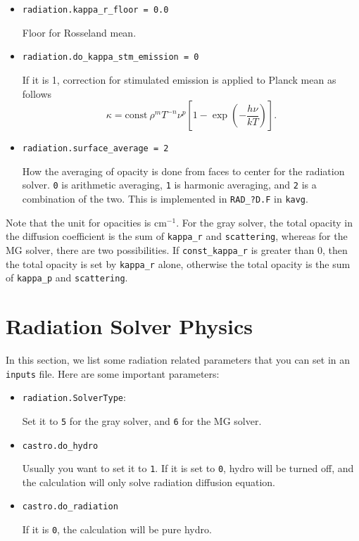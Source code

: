 \documentclass[11pt,letterpaper]{article}
\begin{document}
\begin{itemize}
\item {\tt radiation.kappa\_r\_floor = 0.0}

  Floor for Rosseland mean.

\item{\tt radiation.do\_kappa\_stm\_emission = 0}

  If it is 1, correction for stimulated emission is applied to Planck mean as
  follows
  \begin{equation}
    \kappa = \mathrm{const}\ \rho^{m} T^{-n} \nu^{p}
    \left [1-\exp{\left (-\frac{h\nu}{k T} \right )} \right ].
  \end{equation}

\item {\tt radiation.surface\_average = 2}

 How the averaging of opacity is done from faces to center for
 the radiation solver.  {\tt 0} is arithmetic averaging, {\tt 1}
 is harmonic averaging, and {\tt 2} is a combination of the two.
 This is implemented in {\tt RAD\_?D.F} in {\tt kavg}.


\end{itemize}

\noindent Note that the unit for opacities is $\mathrm{cm}^{-1}$.  For
the gray solver, the total opacity in the diffusion coefficient is the sum
of {\tt kappa\_r} and {\tt scattering}, whereas for the MG solver,
there are two possibilities.  If {\tt const\_kappa\_r} is greater than
0, then the total opacity is set by {\tt kappa\_r} alone, otherwise
the total opacity is the sum of {\tt kappa\_p} and {\tt scattering}.


\section{Radiation Solver Physics}

In this section, we list some radiation related parameters that you
can set in an {\tt inputs} file.  Here are some important parameters:
\begin{itemize}
\item {\tt radiation.SolverType}:

  Set it to {\tt 5} for the gray solver, and {\tt 6} for the MG solver.

\item {\tt castro.do\_hydro}

  Usually you want to set it to {\tt 1}.  If it is set to {\tt 0},
  hydro will be turned off, and the calculation will only solve
  radiation diffusion equation.

\item {\tt castro.do\_radiation}

  If it is {\tt 0}, the calculation will be pure hydro.
\end{itemize}
\end{document}
